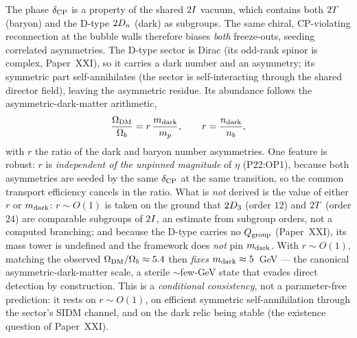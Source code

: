 The phase $\delta_{\rm CP}$ is a property of the shared $2I$ vacuum,
which contains both $2T$ (baryon) and the D-type $2D_n$ (dark) as
subgroups. The same chiral, CP-violating reconnection at the bubble
walls therefore biases \emph{both} freeze-outs, seeding correlated
asymmetries. The D-type sector is Dirac (its odd-rank spinor is
complex, Paper~XXI), so it carries a dark number and an asymmetry; its
symmetric part self-annihilates (the sector is self-interacting through
the shared director field), leaving the asymmetric residue. Its
abundance follows the asymmetric-dark-matter arithmetic,
\begin{equation}
  \frac{\Omega_{\mathrm{DM}}}{\Omega_{b}}=r\,\frac{m_{\rm dark}}{m_p},\qquad r=\frac{n_{\rm dark}}{n_b},
  \label{P22:eq:adm}
\end{equation}
with $r$ the ratio of the dark and baryon number asymmetries. One
feature is robust: $r$ is \emph{independent of the unpinned magnitude}
of $\eta$ (P22:OP1), because both asymmetries are seeded by the same
$\delta_{\rm CP}$ at the same transition, so the common transport
efficiency cancels in the ratio. What is \emph{not} derived is the
value of either $r$ or $m_{\rm dark}$: $r\sim O(1)$ is taken on the
ground that $2D_3$ (order $12$) and $2T$ (order $24$) are
comparable subgroups of $2I$, an estimate from subgroup orders, not
a computed branching; and because the D-type carries no
$Q_{\rm group}$ (Paper~XXI), its mass tower is undefined and the
framework does \emph{not} pin $m_{\rm dark}$. With $r\sim O(1)$,
matching the observed $\Omega_{\mathrm{DM}}/\Omega_{b}\approx5.4$ then \emph{fixes}
$m_{\rm dark}\approx5$~GeV --- the canonical asymmetric-dark-matter
scale, a sterile $\sim$few-GeV state that evades direct detection by
construction. This is a \emph{conditional consistency}, not a
parameter-free prediction: it rests on $r\sim O(1)$, on efficient
symmetric self-annihilation through the sector's SIDM channel, and on
the dark relic being stable (the existence question of Paper~XXI).

